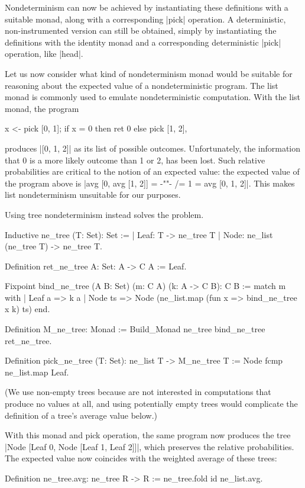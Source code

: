 \documentclass[runningheads]{llncs}
\begin{document}
Nondeterminism can now be achieved by instantiating these definitions with a suitable monad, along with a corresponding |pick| operation. A deterministic, non-instrumented version can still be obtained, simply by instantiating the definitions with the identity monad and a corresponding deterministic |pick| operation, like |head|.

Let us now consider what kind of nondeterminism monad would be suitable for reasoning about the expected value of a nondeterministic program. The list monad is commonly used to emulate nondeterministic computation. With the list monad, the program
\begin{code}
  x <- pick [0, 1]; if x = 0 then ret 0 else pick [1, 2],
\end{code}
produces |[0, 1, 2]| as its list of possible outcomes. Unfortunately, the information that 0 is a more likely outcome than 1 or 2, has been lost. Such relative probabilities are critical to the notion of an expected value: the expected value of the program above is |avg [0, avg [1, 2]] = {-""-} /= 1 = avg [0, 1, 2]|. This makes list nondeterminism unsuitable for our purposes.

Using tree nondeterminism instead solves the problem.
\begin{code}
  Inductive ne_tree (T: Set): Set :=
    | Leaf: T -> ne_tree T
    | Node: ne_list (ne_tree T) -> ne_tree T.

  Definition ret_ne_tree {A: Set}: A -> C A := Leaf.

  Fixpoint bind_ne_tree (A B: Set) (m: C A) (k: A -> C B): C B :=
    match m with
    | Leaf a => k a
    | Node ts => Node (ne_list.map (fun x => bind_ne_tree x k) ts)
    end.

  Definition M_ne_tree: Monad := Build_Monad ne_tree bind_ne_tree ret_ne_tree.

  Definition pick_ne_tree (T: Set): ne_list T -> M_ne_tree T
    := Node fcmp ne_list.map Leaf.
\end{code}
(We use non-empty trees because are not interested in computations that produce no values at all, and using potentially empty trees would complicate the definition of a tree's average value below.)

With this monad and pick operation, the same program now produces the tree |Node [Leaf 0, Node [Leaf 1, Leaf 2]]|, which preserves the relative probabilities. The expected value now coincides with the weighted average of these trees:
\begin{code}
  Definition ne_tree.avg: ne_tree R -> R := ne_tree.fold id ne_list.avg.
\end{code}
\end{document}
